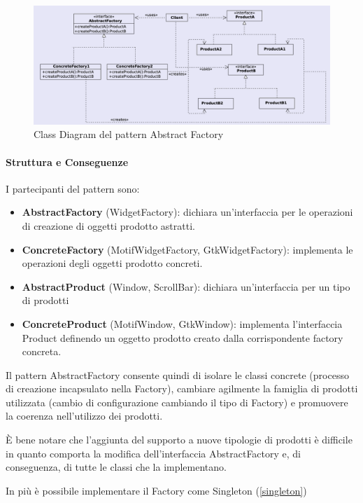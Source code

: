 \begin{figure}[H]
    \centering
    \includegraphics[width=1\linewidth]{assets/pattern/abstract-factory/abstract-factory-struttura.png}
    \caption{Class Diagram del pattern Abstract Factory}
\end{figure}

\paragraph{Struttura e Conseguenze} I partecipanti del pattern sono:
\begin{itemize}
    \item \textbf{AbstractFactory} (WidgetFactory): dichiara un’interfaccia per le operazioni di creazione di oggetti prodotto astratti.
    \item \textbf{ConcreteFactory} (MotifWidgetFactory, GtkWidgetFactory): implementa le operazioni degli oggetti prodotto concreti. 
    \item \textbf{AbstractProduct} (Window, ScrollBar): dichiara un’interfaccia per un tipo di prodotti
    \item \textbf{ConcreteProduct} (MotifWindow, GtkWindow): implementa l’interfaccia Product definendo un oggetto prodotto creato dalla corrispondente factory concreta.
\end{itemize}

Il pattern AbstractFactory consente quindi di isolare le classi concrete (processo di creazione incapsulato nella Factory), cambiare agilmente la famiglia di prodotti utilizzata (cambio di configurazione cambiando il tipo di Factory) e promuovere la coerenza nell'utilizzo dei prodotti.

È bene notare che l'aggiunta del supporto a nuove tipologie di prodotti è difficile in quanto comporta la modifica dell'interfaccia AbstractFactory e, di conseguenza, di tutte le classi che la implementano.

In più è possibile implementare il Factory come Singleton (\ref{singleton})

